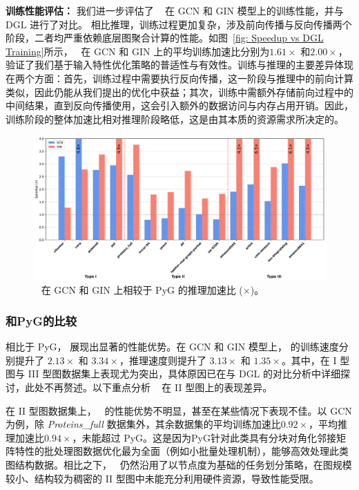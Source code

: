 \textbf{训练性能评估：}
我们进一步评估了 ~\Mname{} 在 GCN 和 GIN 模型上的训练性能，并与 DGL 进行了对比。
相比推理，训练过程更加复杂，涉及前向传播与反向传播两个阶段，二者均严重依赖底层图聚合计算的性能。如图~\ref{fig: Speedup vs DGL Training}所示，~\Mname{} 在 GCN 和 GIN 上的平均训练加速比分别为$1.61\times$ 和$2.00\times$，验证了我们基于输入特性优化策略的普适性与有效性。训练与推理的主要差异体现在两个方面：首先，训练过程中需要执行反向传播，这一阶段与推理中的前向计算类似，因此仍能从我们提出的优化中获益；其次，训练中需额外存储前向过程中的中间结果，直到反向传播使用，这会引入额外的数据访问与内存占用开销。因此，训练阶段的整体加速比相对推理阶段略低，这是由其本质的资源需求所决定的。
\begin{figure}[htbp] 
    \centering
    \includegraphics[width=0.9\linewidth]{images/pyg_infer_cmp.pdf} 
    \caption{~\Mname{} 在 GCN 和 GIN 上相较于 PyG 的推理加速比 ($\times$)。}
    \label{fig: Speedup vs PyG inference}
    \setlength{\abovecaptionskip}{0.4cm} %
    \setlength{\belowcaptionskip}{-0.4cm} %
\end{figure}
\subsubsection{和PyG的比较}
相比于 PyG，\Mname{} 展现出显著的性能优势。在 GCN 和 GIN 模型上，\Mname{} 的训练速度分别提升了 $2.13\times$ 和 $3.34\times$，推理速度则提升了 $3.13\times$ 和 $1.35\times$。其中，在 I 型图与 III 型图数据集上表现尤为突出，具体原因已在与 DGL 的对比分析中详细探讨，此处不再赘述。以下重点分析 ~\Mname{} 在 II 型图上的表现差异。

在 II 型图数据集上，~\Mname{} 的性能优势不明显，甚至在某些情况下表现不佳。以 GCN 为例，除 \textit{Proteins\_full} 数据集外，其余数据集的平均训练加速比$0.92\times$，平均推理加速比$0.94\times$，未能超过 PyG。这是因为PyG针对此类具有分块对角化邻接矩阵特性的批处理图数据优化最为全面（例如小批量处理机制），能够高效处理此类图结构数据。相比之下，~\Mname{} 仍然沿用了以节点度为基础的任务划分策略，在图规模较小、结构较为稠密的 II 型图中未能充分利用硬件资源，导致性能受限。

